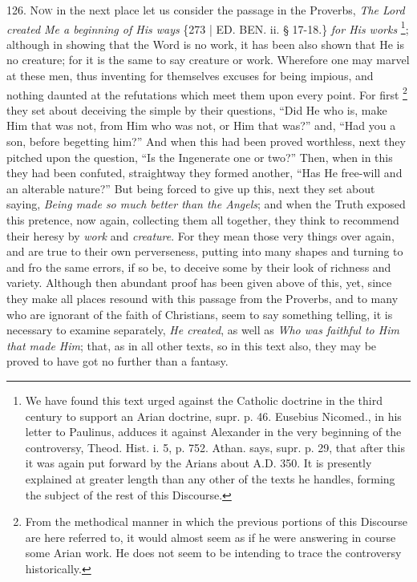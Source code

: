 126. N\textsc{ow} in the next place let
us consider the passage in the Proverbs, \emph{The Lord created Me a
beginning of His ways} \{273 | ED. BEN. ii. § 17-18.\} \emph{for
His works} \footnote{We have found this text urged against the Catholic doctrine in the
third century to support an Arian doctrine, supr. p. 46. Eusebius
Nicomed., in his letter to Paulinus, adduces it against Alexander in
the very beginning of the controversy, Theod. Hist. i. 5, p. 752.
Athan. says, supr. p. 29, that after this it was again put forward by
the Arians about A.D. 350. It is presently explained at
greater length than any other of the texts he handles, forming the
subject of the rest of this Discourse.}; although
in showing that the Word is no work, it has been also shown that He is
no creature; for it is the same to say creature or work. Wherefore one
may marvel at these men, thus inventing for themselves excuses for
being impious, and nothing daunted at the refutations which meet them
upon every point. For first \footnote{From the methodical manner in which the previous portions of this
Discourse are here referred to, it would almost seem as if he were
answering in course some Arian work. He does not seem to be intending
to trace the controversy historically.}
they set about deceiving the simple by their questions, ``Did He who
is, make Him that was not, from Him who was not, or Him that was?''
and, ``Had you a son, before begetting him?'' And when this had been
proved worthless, next they pitched upon the question, ``Is the
Ingenerate one or two?'' Then, when in this they had been confuted,
straightway they formed another, ``Has He free-will and an alterable
nature?'' But being forced to give up this, next they set about saying,
\emph{Being made so much better than the Angels}; and when the Truth
exposed this pretence, now again, collecting them all together, they
think to recommend their heresy by \emph{work} and \emph{creature}.
For they mean those very things over again, and are true to their own
perverseness, putting into many shapes and turning to and fro the same
errors, if so be, to deceive some by their look of richness and
variety. Although then abundant proof has been given above of this,
yet, since they make all places resound with this passage from the
Proverbs, and to many who are ignorant of the faith of
Christians, seem to say something telling, it is necessary to examine
separately, \emph{He created}, as well as \emph{Who was faithful to Him
that made Him}; that, as in all other texts, so in this text also,
they may be proved to have got no further than a fantasy.

